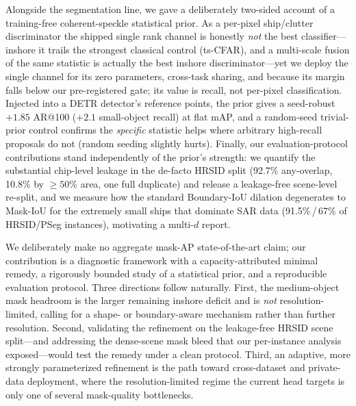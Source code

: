 \documentclass[journal]{IEEEtran}
\begin{document}
Alongside the segmentation line, we gave a deliberately two-sided account of a training-free coherent-speckle statistical prior. As a per-pixel ship/clutter discriminator the shipped single rank channel is honestly \emph{not} the best classifier---inshore it trails the strongest classical control (ts-CFAR), and a multi-scale fusion of the same statistic is actually the best inshore discriminator---yet we deploy the single channel for its zero parameters, cross-task sharing, and because its margin falls below our pre-registered gate; its value is recall, not per-pixel classification. Injected into a DETR detector's reference points, the prior gives a seed-robust $+1.85$ AR@100 ($+2.1$ small-object recall) at flat mAP, and a random-seed trivial-prior control confirms the \emph{specific} statistic helps where arbitrary high-recall proposals do not (random seeding slightly hurts). Finally, our evaluation-protocol contributions stand independently of the prior's strength: we quantify the substantial chip-level leakage in the de-facto HRSID split (92.7\% any-overlap, 10.8\% by $\ge\!50\%$ area, one full duplicate) and release a leakage-free scene-level re-split, and we measure how the standard Boundary-IoU dilation degenerates to Mask-IoU for the extremely small ships that dominate SAR data (91.5\%\,/\,67\% of HRSID/PSeg instances), motivating a multi-$d$ report.

We deliberately make no aggregate mask-AP state-of-the-art claim; our contribution is a diagnostic framework with a capacity-attributed minimal remedy, a rigorously bounded study of a statistical prior, and a reproducible evaluation protocol. Three directions follow naturally. First, the medium-object mask headroom is the larger remaining inshore deficit and is \emph{not} resolution-limited, calling for a shape- or boundary-aware mechanism rather than further resolution. Second, validating the refinement on the leakage-free HRSID scene split---and addressing the dense-scene mask bleed that our per-instance analysis exposed---would test the remedy under a clean protocol. Third, an adaptive, more strongly parameterized refinement is the path toward cross-dataset and private-data deployment, where the resolution-limited regime the current head targets is only one of several mask-quality bottlenecks.



\end{document}

